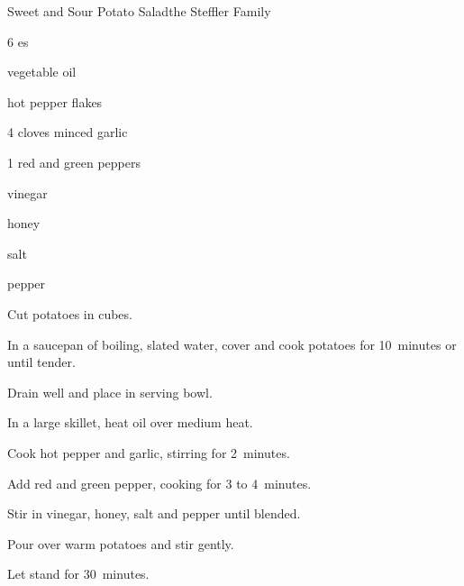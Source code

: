 \begin{recipe}{Sweet and Sour Potato Salad}{the Steffler Family}{}

\begin{ingredients}
\item 6 es
\item {} vegetable oil
\item hot pepper flakes
\item 4 cloves minced garlic
\item 1 red and green peppers
\item \C{\third} vinegar
\item {} honey
\item \tp{\half} salt
\item \tp{\half} pepper
\end{ingredients}

\begin{directions}
\item Cut potatoes in  cubes.
\item In a saucepan of boiling, slated water, cover and cook potatoes for 10~minutes or until tender.
\item Drain well and place in serving bowl.
\item In a large skillet, heat oil over medium heat.
\item Cook hot pepper and garlic, stirring for 2~minutes.
\item Add red and green pepper, cooking for 3 to 4~minutes.
\item Stir in vinegar, honey, salt and pepper until blended.
\item Pour over warm potatoes and stir gently.
\item Let stand for 30~minutes.
\end{directions}
\end{recipe}
